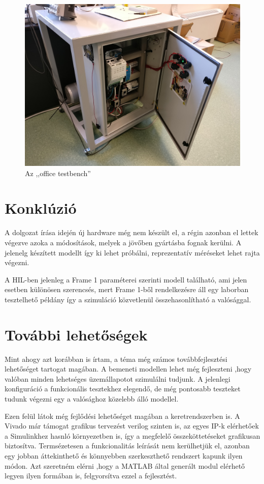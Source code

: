 \begin{figure}[H]
	\centering
	\includegraphics[width = \textwidth]{figures/office_testbench.jpg}
	\caption{Az ,,office testbench''} 
	\label{fig:office_testbench}
\end{figure}



\section{Konklúzió}

A dolgozat írása idején új hardware még nem készült el, a régin azonban el lettek végezve azoka a módosítások, melyek a jövőben gyártásba fognak kerülni. A jelenelg készített modellt így ki lehet próbálni, reprezentatív méréseket lehet rajta végezni.

A HIL-ben jelenleg a Frame 1 paraméterei szerinti modell található, ami jelen esetben különösen szerencsés, mert Frame 1-ből rendelkezésre áll egy laborban tesztelhető példány így a szimuláció közvetlenül összehasonlítható a valósággal.

\section{További lehetőségek}

Mint ahogy azt korábban is írtam, a téma még számos továbbfejlesztési lehetőséget tartogat magában. A bemeneti modellen lehet még fejleszteni ,hogy valóban minden lehetséges üzemállapotot szimulálni tudjunk. A jelenlegi konfiguráció a funkcionális tesztekhez elegendő, de még pontosabb teszteket tudunk végezni egy a valósághoz közelebb álló modellel.

Ezen felül látok még fejlődési lehetőséget magában a keretrendszerben is. A Vivado már támogat grafikus tervezést verilog szinten is, az egyes IP-k elérhetőek a Simulinkhez hasnló környezetben is, így a megfelelő összeköttetéseket grafikusan biztosítva. Termsézetesen a funkcionalitás leírását nem kerülhetjük el, azonban egy jobban áttekinthető és könnyebben szerkeszthető rendszert kapunk ilyen módon. Azt szeretném elérni ,hogy a MATLAB által generált modul elérhető legyen ilyen formában is, felgyorsítva ezzel a fejlesztést.